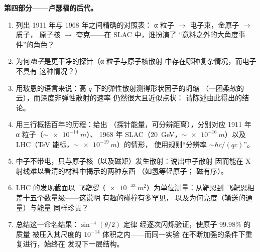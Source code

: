 \begin{problem}
\medskip\noindent\textbf{第四部分——卢瑟福的后代。}
\begin{enumerate}[resume]
  \item 列出 1911 年与 1968 年之间精确的对照表：
        α 粒子 $\to$ 电子束，金原子 $\to$ 质子，
        原子核 $\to$ 夸克——在 SLAC 中，谁扮演了
        “意料之外的大角度事件”的角色？
  \item 为何\emph{电子}是更干净的探针（α 粒子与原子核散射
        中存在哪种复杂情况，而电子不具有
        这种情况？）
  \item 用玻恩的语言来说：高 $q$ 下的弹性散射测得形状因子的坍缩
        （一团柔软的云），而深度非弹性散射的速率
        仍然很大且近似点状：
        请陈述由此得出的结论。
  \item 用三行概括百年的历程：给出
        （探针能量，可分辨距离），分别对应 1911 年 α 粒子（$\sim\qty{e-14}{m}$）、
        1968 年 SLAC（\qty{20}{GeV}，$\sim\qty{e-16}{m}$）以及
        LHC（TeV 能标，$\sim\qty{e-19}{m}$）的情形，
        使用规则“分辨率 $\sim \hbar c/(qc)$”。
  \item 中子不带电，只与原子核（以及磁矩）发生散射：说出中子散射
        因而能在 X 射线难以看清的材料中揭示的两种东西
        （如氢等轻原子；
        磁有序）。
  \item LHC 的发现截面以
        \emph{飞靶恩}（$\qty{e-43}{m^2}$）为单位测量：从靶恩到
        飞靶恩相差十五个数量级——这说明
        有趣的碰撞有多罕见，
        以及为何亮度（输送的通量）与能量
        同样珍贵？
  \item 总结这一命名结果：$\sin^{-4}(\theta/2)$ 定律
        经逐次闪烁验证，使原子 $99.98\%$ 的质量
        被压入其尺度的 $10^{-14}$ 体积之内——而同一实验
        在不断加强的条件下重复进行，始终在
        发现下一层结构。
\end{enumerate}
\end{problem}
